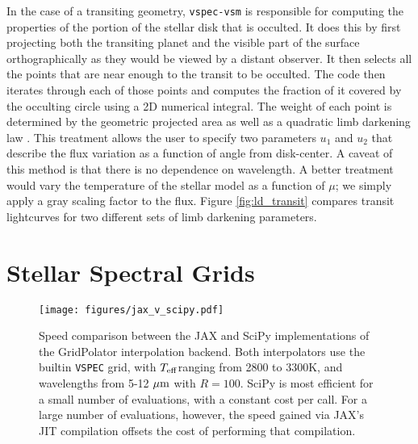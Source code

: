 \documentclass[twocolumn]{aastex631}
\newcommand{\teff}{$T_{\rm eff}$}
\newcommand{\vspec}[1]{\texttt{VSPEC}#1}
\begin{document}
In the case of a transiting geometry, \texttt{vspec-vsm} is responsible for computing the properties of the portion of the stellar disk that is occulted. It does this by first projecting both the transiting planet and the visible part of the surface orthographically as they would be viewed by a distant observer. It then selects all the points that are near enough to the transit to be occulted. The code then iterates through each of those points and computes the fraction of it covered by the occulting circle using a 2D numerical integral. The weight of each point is determined by the geometric projected area as well as a quadratic limb darkening law \citep[see][]{espinoza2015}. This treatment allows the user to specify two parameters $u_1$ and $u_2$ that describe the flux variation as a function of angle from disk-center. A caveat of this method is that there is no dependence on wavelength. A better treatment would vary the temperature of the stellar model as a function of $\mu$; we simply apply a gray scaling factor to the flux. Figure \ref{fig:ld_transit} compares transit lightcurves for two different sets of limb darkening parameters.


\section{Stellar Spectral Grids}
\label{sec:gridpolator}

\begin{figure}
    \centering
    \texttt{[image: figures/jax\_v\_scipy.pdf]}
    \caption{
        Speed comparison between the JAX and SciPy implementations of the GridPolator interpolation backend. Both interpolators use the builtin \vspec{} grid, with \teff ranging from 2800 to 3300K, and wavelengths from 5-12 ${\rm \mu m}$ with $R=100$. SciPy is most efficient for a small number of evaluations, with a constant cost per call. For a large number of evaluations, however, the speed gained via JAX's JIT compilation offsets the cost of performing that compilation.
    }
    \label{fig:jax_v_scipy}
\end{figure}
\end{document}
